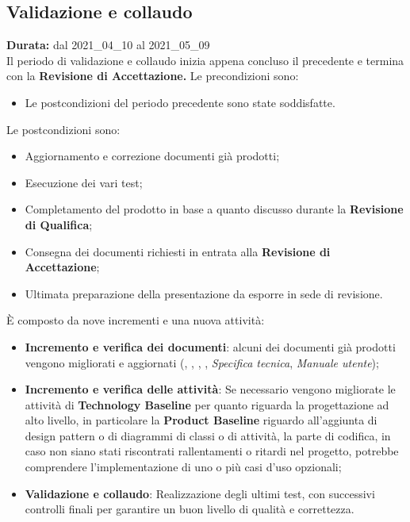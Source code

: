 \subsection{Validazione e collaudo}
\label{validazione_e_collaudo}
\textbf{Durata:} dal 2021\_04\_10 al 2021\_05\_09\\
Il periodo di validazione e collaudo inizia appena concluso il precedente e termina con la \textbf{Revisione di Accettazione.}
Le precondizioni sono:
\begin{itemize}
    \item Le postcondizioni del periodo precedente sono state soddisfatte.
\end{itemize}
Le postcondizioni sono:
\begin{itemize}
    \item Aggiornamento e correzione documenti già prodotti;
    \item Esecuzione dei vari test;
    \item Completamento del prodotto in base a quanto discusso durante la \textbf{Revisione di Qualifica};
    \item Consegna dei documenti richiesti in entrata alla \textbf{Revisione di Accettazione};
    \item Ultimata preparazione della presentazione da esporre in sede di revisione.
\end{itemize}
È composto da nove incrementi e una nuova attività:
\begin{itemize}
    \item \textbf{Incremento e verifica dei documenti}: alcuni dei documenti già prodotti vengono migliorati e aggiornati ({\NdP}, {\PdP}, {\Glossario}, {\PdQ}, \textit{Specifica tecnica}, \textit{Manuale utente}); 
    \item \textbf{Incremento e verifica delle attività}: Se necessario vengono migliorate le attività di \textbf{Technology Baseline} per quanto riguarda la progettazione ad alto livello, in particolare la \textbf{Product Baseline} riguardo all'aggiunta di design pattern o di diagrammi di classi o di attività, la parte di codifica, in caso non siano stati riscontrati rallentamenti o ritardi nel progetto, potrebbe comprendere l'implementazione di uno o più casi d'uso opzionali;
    \item \textbf{Validazione e collaudo}: Realizzazione degli ultimi test, con successivi controlli finali per garantire un buon livello di qualità e correttezza.
\end{itemize}
\newpage
